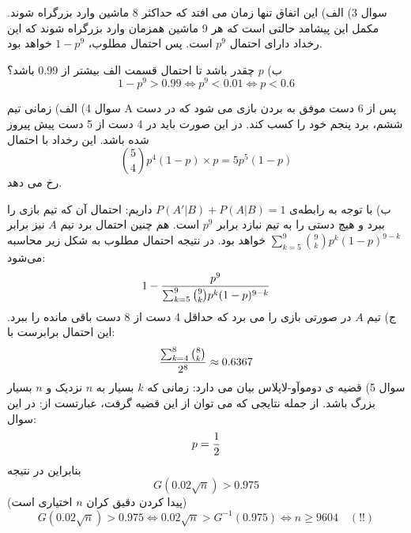 \documentclass[10pt,letterpaper]{article}
\begin{document}
سوال 3) الف) این اتفاق تنها زمان می افتد که حداکثر 8 ماشین وارد بزرگراه شوند. مکمل این پیشامد حالتی است که هر 9 ماشین همزمان وارد بزرگراه شوند که این رخداد دارای احتمال 
$
p^9
$
است. پس احتمال مطلوب، 
$
1-p^9
$
خواهد بود.

ب) $p$ چقدر باشد تا احتمال قسمت الف بیشتر از $0.99$ باشد؟
$$
1-p^9>0.99\iff p^9<0.01\iff p<0.6
$$

سوال 4) الف) زمانی تیم A پس از 6 دست موفق به بردن بازی می شود که در دست ششم، برد پنجم خود را کسب کند. در این صورت باید در 4 دست از 5 دست پیش پیروز شده باشد. این رخداد با احتمال
$$
\binom{5}{4}p^4(1-p)\times p=5p^5(1-p)
$$
رخ می دهد.

ب) با توجه به رابطه‌ی 
$
P(A'|B)+P(A|B)=1
$
داریم:
احتمال آن که تیم  بازی را ببرد و هیچ دستی را به تیم  نبازد برابر $p^9$ است. هم چنین احتمال برد تیم $A$ نیز برابر 
$
\sum_{k=5}^{9}\binom{9}{k}p^k(1-p)^{9-k}
$
 خواهد بود. در نتیجه احتمال مطلوب به شکل زیر محاسبه می‌شود:
$$
1-{p^9\over \sum_{k=5}^{9}\binom{9}{k}p^k(1-p)^{9-k}}
$$
ج) تیم $A$ در صورتی بازی را می برد که حداقل 4 دست از 8 دست باقی مانده را ببرد. این احتمال برابرست با:
$$
{\sum_{k=4}^{8}\binom{8}{k}\over 2^8}\approx 0.6367
$$
سوال 5) قضیه ی دوموآو-لاپلاس بیان می دارد:
زمانی که $k$ بسیار به $n$ نزدیک و $n$ بسیار بزرگ باشد. از جمله نتایجی که می توان از این قضیه گرفت، عبارتست از:
در این سوال:
$$
p={1\over 2}
$$
بنابراین
در نتیجه
$$
G\left({0.02\sqrt n}\right)>0.975
$$
{\color{red}
(پیدا کردن دقیق کران $n$ اختیاری است)
}
$$
G\left({0.02\sqrt n}\right)>0.975\iff {0.02\sqrt n}>G^{-1}(0.975)\iff n\ge 9604\quad(!!)
$$
\end{document}
